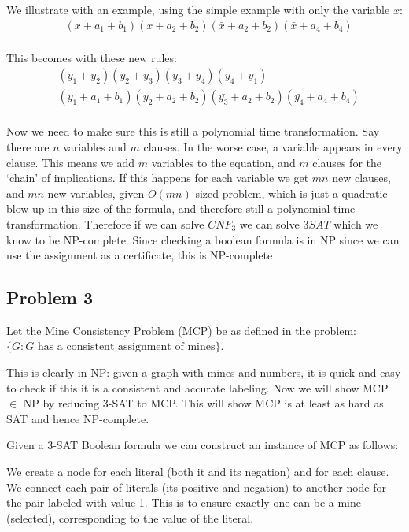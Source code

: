 \documentclass[english]{article}
\begin{document}
We illustrate with an example, using the simple example with only the variable $x$:
\begin{align*}
& (x + a_1 + b_1)(x + a_2 + b_2)(\bar{x} + a_2 + b_2)(\bar{x} + a_4 + b_4) \\
\end{align*}

This becomes with these new rules:
\begin{align*}
& (\bar{y_1} + y_2)(\bar{y_2} + y_3)(\bar{y_3} + y_4)(\bar{y_4} + y_1) \\
& (y_1 + a_1 + b_1)(y_2 + a_2 + b_2)(\bar{y_3} + a_2 + b_2)(\bar{y_4} + a_4 + b_4) \\
\end{align*}

Now we need to make sure this is still a polynomial time transformation. Say there are $n$ variables and $m$
clauses. In the worse case, a variable appears in every clause. This means we add $m$ variables to the equation,
and $m$ clauses for the `chain' of implications. If this happens for each variable we get $mn$ new clauses, and
$mn$ new variables, given $O(mn)$ sized problem, which is just a quadratic blow up in this size of the formula,
and therefore still a polynomial time transformation. Therefore if we can solve $CNF_3$ we can solve $3SAT$ which
we know to be NP-complete. Since checking a boolean formula is in NP since we can use the assignment as a 
certificate, this is NP-complete

\subsection*{Problem 3}
Let the Mine Consistency Problem (MCP) be as defined in the problem:\\
$\{G : G \text{ has a consistent assignment of mines}\}$.

This is clearly in NP: given a graph with mines and numbers, it is quick and easy to check if this it 
is a consistent and accurate labeling. Now we will show MCP $\in$ NP by reducing 3-SAT to MCP.
This will show MCP is at least as hard as SAT and hence NP-complete.

Given a 3-SAT Boolean formula we can construct an instance of MCP as follows:

We create a node for each literal (both it and its negation) and for each clause. We connect each
pair of literals (its positive and negation) to another node for the pair labeled with value 1. This
is to ensure exactly one can be a mine (selected), corresponding to the value of the literal.
\end{document}
